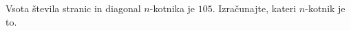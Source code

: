 \documentclass[addpoints]{exam}
\begin{document}
\begin{questions}
    \question[3]
        Vsota števila stranic in diagonal $n$-kotnika je $105$. Izračunajte, kateri $n$-kotnik je to.






\end{questions}
\end{document}
